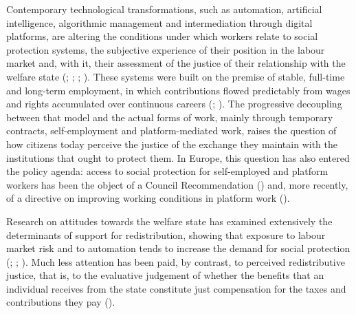 \documentclass[
  12pt,
]{article}
\begin{document}
Contemporary technological transformations, such as automation,
artificial intelligence, algorithmic management and intermediation
through digital platforms, are altering the conditions under which
workers relate to social protection systems, the subjective experience
of their position in the labour market and, with it, their assessment of
the justice of their relationship with the welfare state
(;
;
;
). These systems
were built on the premise of stable, full-time and long-term employment,
in which contributions flowed predictably from wages and rights
accumulated over continuous careers
(;
). The
progressive decoupling between that model and the actual forms of work,
mainly through temporary contracts, self-employment and
platform-mediated work, raises the question of how citizens today
perceive the justice of the exchange they maintain with the institutions
that ought to protect them. In Europe, this question has also entered
the policy agenda: access to social protection for self-employed and
platform workers has been the object of a Council Recommendation
() and, more recently, of a directive on improving
working conditions in platform work
().

Research on attitudes towards the welfare state has examined extensively
the determinants of support for redistribution, showing that exposure to
labour market risk and to automation tends to increase the demand for
social protection (; ;
).
Much less attention has been paid, by contrast, to perceived
redistributive justice, that is, to the evaluative judgement of whether
the benefits that an individual receives from the state constitute just
compensation for the taxes and contributions they pay
().
\end{document}
